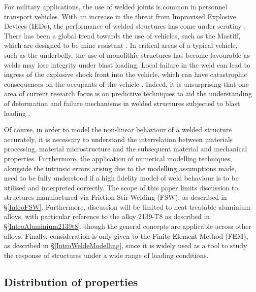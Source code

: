For military applications, the use of welded joints is common in personnel transport vehicles. With an increase in the threat from Improvised Explosive Devices (IEDs), the performance of welded structures has come under scrutiny \cite{Ramasamy2011}. There has been a global trend towards the use of vehicles, such as the Mastiff, which are designed to be mine resistant \cite{Morse2011}. In critical areas of a typical vehicle, such as the underbelly, the use of monolithic structures has become favourable as welds may lose integrity under blast loading. Local failure in the weld can lead to ingress of the explosive shock front into the vehicle, which can have catastrophic consequences on the occupants of the vehicle \cite{Ramasamy2011}. Indeed, it is unsurprising that one area of current research focus is on predictive techniques to aid the understanding of deformation and failure mechanisms in welded structures subjected to blast loading \cite{McWilliams2013,Grujicic2011a,Grujicic2012}.

Of course, in order to model the non-linear behaviour of a welded structure accurately, it is necessary to understand the interrelation between materials processing, material microstructure and the subsequent material and mechanical properties. Furthermore, the application of numerical modelling techniques, alongside the intrinsic errors arising due to the modelling assumptions made, need to be fully understood if a high fidelity model of weld behaviour is to be utilised and interpreted correctly.
The scope of this paper limits discussion to structures manufactured via Friction Stir Welding (FSW), as described in \S\ref{IntroFSW}. Furthermore, discussion will be limited to heat treatable aluminium alloys, with particular reference to the alloy 2139-T8 as described in \S\ref{IntroAluminium2139t8}, though the general concepts are applicable across other alloys. Finally, consideration is only given to the Finite Element Method (FEM), as described in \S\ref{IntroWeldeModelling}, since it is widely used as a tool to study the response of structures under a wide range of loading conditions.
\subsection{Distribution of properties}
\label{LitRev:ModelStructuralQSMacroDistribution}

